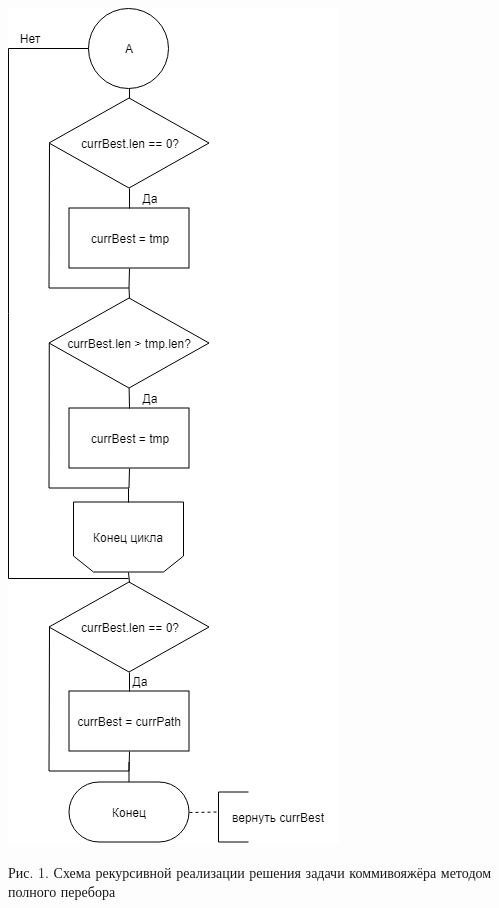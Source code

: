 \documentclass[12pt]{report}
\begin{document}
\begin{center}
		\includegraphics[scale=0.7]{Rec2.png}
		
		Рис. 1. Схема рекурсивной реализации решения задачи коммивояжёра методом полного перебора
	\end{center}
	
	
	
	
	
	
	
	
	
	
	
	
	
	
	
	
	
	
	
	
	
	
	
	
	
	
	
	
	
	
\end{document}
